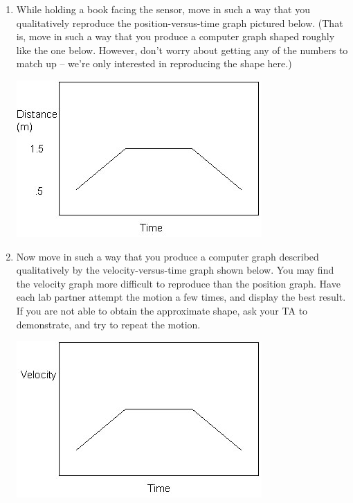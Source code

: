 \begin{enumerate}[label=\arabic*.]

\item 
	While holding a book facing the sensor, 
	move in such a way that you qualitatively reproduce the 
	position-versus-time graph pictured below.
	(That is, move in such a way that you produce a
	computer graph shaped roughly like the one below.  
	However, don't worry about getting any of the numbers to match up -- we're
	only interested in reproducing the shape here.)
\begin{center} \includegraphics*{imgs/6labs/6Alab/6Aexp2/exp_2_fig2_fx.jpg} \end{center}

\item 
	Now move in such a way that you produce a computer graph described 
	qualitatively by the velocity-versus-time graph shown below.  
	You may find the velocity graph more difficult to reproduce than the position graph.  Have each lab partner attempt the motion a few times, and display the best result.  If you are not able to obtain the approximate shape, ask your TA to demonstrate, and try to repeat the motion.
\begin{center} \includegraphics*{imgs/6labs/6Alab/6Aexp2/exp2_fig3_fx.jpg} \end{center}

\end{enumerate}


